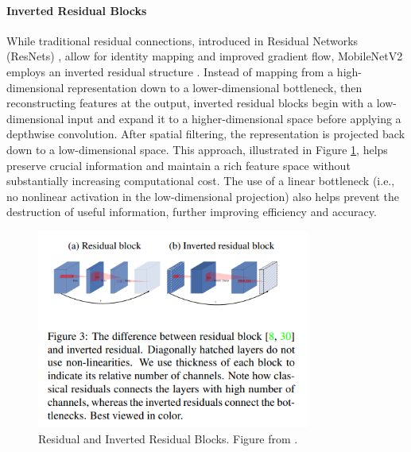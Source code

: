 
\paragraph{Inverted Residual Blocks}
While traditional residual connections, introduced in Residual Networks (ResNets) \cite{he2016} , allow for identity mapping and improved gradient flow, MobileNetV2 employs an inverted residual structure \cite{sandler2018mobilenetv2}. Instead of mapping from a high-dimensional representation down to a lower-dimensional bottleneck, then reconstructing features at the output, inverted residual blocks begin with a low-dimensional input and expand it to a higher-dimensional space before applying a depthwise convolution. After spatial filtering, the representation is projected back down to a low-dimensional space. This approach, illustrated in Figure \ref{fig:residual}, helps preserve crucial information and maintain a rich feature space without substantially increasing computational cost. The use of a linear bottleneck (i.e., no nonlinear activation in the low-dimensional projection) also helps prevent the destruction of useful information, further improving efficiency and accuracy.  

\begin{figure}[ht]
    \centering
    \includegraphics[width=0.8\textwidth]{Images/inverted_residual.png} 
    \caption{Residual and Inverted Residual Blocks. Figure from \cite{sandler2018mobilenetv2}. }
    \label{fig:residual}
\end{figure}

